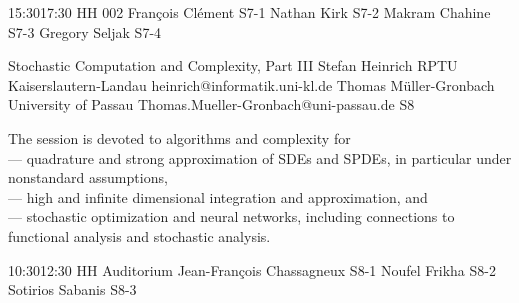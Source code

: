 \documentclass[12pt,lettersize,oneside]{book} %
\begin{document}

\sessionPart{}%
{\hfill{}
{15:30}{17:30} %
{HH 002}} %
{François Clément}
{S7-1}
{Nathan Kirk}
{S7-2}
{Makram Chahine}
{S7-3}
{Gregory Seljak}
{S7-4}



\clearpage

\begin{session}
 {Stochastic Computation and Complexity, Part III}%
 {Stefan Heinrich}%
 {RPTU Kaiserslautern-Landau}%
 {heinrich@informatik.uni-kl.de}%
 {Thomas M\"uller-Gronbach}%
 {University of Passau}%
 {Thomas.Mueller-Gronbach@uni-passau.de}%
 {S8}%
 {}%

 The session is devoted to algorithms and complexity for\\
 --- quadrature and strong approximation of SDEs and SPDEs, in particular under nonstandard assumptions,\\
 --- high and infinite dimensional integration and approximation, and\\
 --- stochastic optimization and neural networks,
 including connections to functional analysis and stochastic analysis.
\end{session}



\sessionPart{}%
{\hfill{}
{10:30}{12:30} %
{HH Auditorium}} %
{Jean-François Chassagneux}
{S8-1}
{Noufel Frikha}
{S8-2}
{Sotirios Sabanis}
{S8-3}
\end{document}
